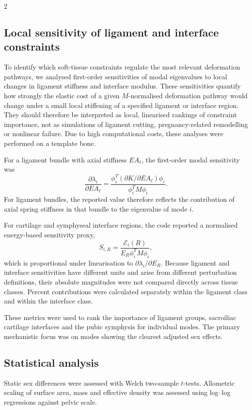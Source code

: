 \documentclass[openacc]{rsproca_new}
\begin{document}
\begin{multicols}{2}
\subsection{Local sensitivity of ligament and interface constraints}

To identify which soft-tissue constraints regulate the most relevant deformation pathways, we analysed first-order sensitivities of modal eigenvalues to local changes in ligament stiffness and interface modulus. These sensitivities quantify how strongly the elastic cost of a given $M$-normalised deformation pathway would change under a small local stiffening of a specified ligament or interface region. They should therefore be interpreted as local, linearised rankings of constraint importance, not as simulations of ligament cutting, pregnancy-related remodelling or nonlinear failure. Due to high computational costs, these analyses were performed on a template bone. 

For a ligament bundle with axial stiffness $EA_{\ell}$, the first-order modal sensitivity was
\[
\frac{\partial \lambda_i}{\partial EA_{\ell}} =
\frac{\phi_i^{T}(\partial K/\partial EA_{\ell})\phi_i}
{\phi_i^{T}M\phi_i}.
\]
For ligament bundles, the reported value therefore reflects the contribution of axial spring stiffness in that bundle to the eigenvalue of mode $i$.

For cartilage and symphyseal interface regions, the code reported a normalised energy-based sensitivity proxy,
\[
S_{i,R} =
\frac{\mathcal{E}_{i}(R)}
{E_R \phi_i^{T}M\phi_i},
\]
which is proportional under linearisation to $\partial \lambda_i/\partial E_R$. Because ligament and interface sensitivities have different units and arise from different perturbation definitions, their absolute magnitudes were not compared directly across tissue classes. Percent contributions were calculated separately within the ligament class and within the interface class.

These metrics were used to rank the importance of ligament groups, sacroiliac cartilage interfaces and the pubic symphysis for individual modes. The primary mechanistic focus was on modes showing the clearest adjusted sex effects.

\subsection{Statistical analysis}

Static sex differences were assessed with Welch two-sample $t$-tests. Allometric scaling of surface area, mass and effective density was assessed using log--log regressions against pelvic scale.


\end{multicols}
\end{document}
